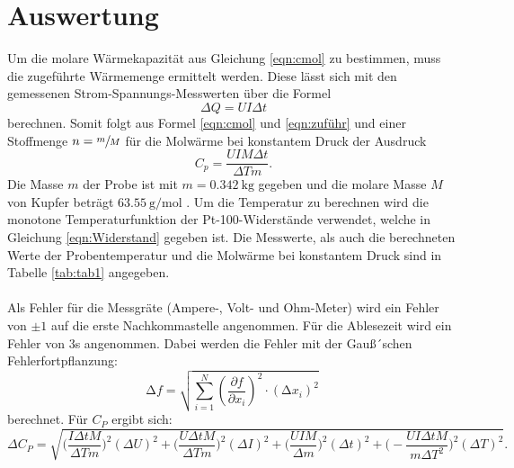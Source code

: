 \section{Auswertung}
\label{sec:Auswertung}
Um die molare Wärmekapazität aus Gleichung \ref{eqn:cmol} zu bestimmen, muss die zugeführte
Wärmemenge ermittelt werden. Diese lässt sich mit den gemessenen Strom-Spannungs-Messwerten über
die Formel
\begin{equation}
  \Delta Q = UI\Delta t
  \label{eqn:zuführ}
\end{equation}
berechnen.
Somit folgt aus Formel \ref{eqn:cmol} und \ref{eqn:zuführ} und einer Stoffmenge $n=\sfrac{m}{M}$
für die Molwärme bei konstantem Druck der Ausdruck
\begin{equation}
  C_p=\frac{UIM\Delta t}{\Delta T m}.
  \label{eqn:Cp}
\end{equation}
Die Masse $m$ der Probe ist mit $m=\SI{0.342}{\kg}$ gegeben und die molare Masse $M$ von
Kupfer beträgt $\SI{63.55}{\g\per\mol}$ \cite{kompress}.
Um die Temperatur zu berechnen wird die monotone Temperaturfunktion der
Pt-100-Widerstände verwendet, welche in Gleichung \ref{eqn:Widerstand}
gegeben ist. %
Die Messwerte, als auch die berechneten Werte der Probentemperatur und die
Molwärme bei konstantem Druck sind in Tabelle \ref{tab:tab1} angegeben.\\
\\
Als Fehler für die Messgräte (Ampere-, Volt- und Ohm-Meter) wird ein Fehler von
$\pm 1$ auf die erste Nachkommastelle angenommen. Für die Ablesezeit wird ein
Fehler von 3\;s angenommen.
Dabei werden die Fehler mit der Gauß´schen Fehlerfortpflanzung:
\begin{equation}
  \increment f = \sqrt{ \sum_{i=1}^N \left( \frac{\partial f}{\partial x_i}\right)^2
  \cdot (\increment x_i)^2  } \:
  \label{eqn:gaus}
\end{equation}
berechnet. Für $C_P$ ergibt sich:
\begin{equation}
  \Delta C_P=\sqrt{\Big(\frac{I\Delta t M}{\Delta T m}\Big)^2 (\Delta U)^2+\Big(\frac{U\Delta t M}{\Delta T m}\Big)^2 (\Delta I)^2
  +\Big(\frac{UIM}{\Delta m}\Big)^2 (\Delta t)^2  +\Big (-\frac{UI\Delta t M}{m \Delta T^2}\Big)^2 (\Delta T)^2}.
  \label{eqn:fehler}
\end{equation}



